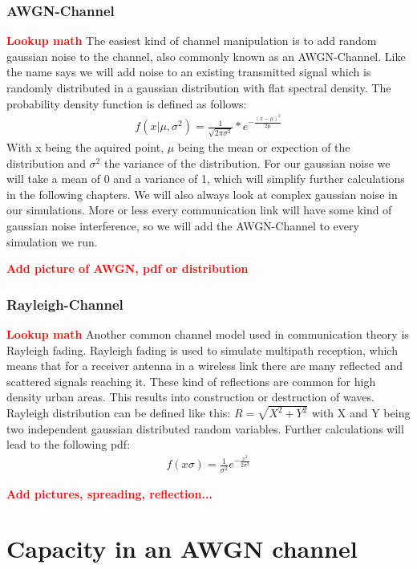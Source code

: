 \documentclass[12pt,oneside, reqno]{report}
\newcommand\boldred[1]{\textcolor{red}{\textbf{#1}}}
\begin{document}
\subsection{AWGN-Channel}
\boldred{Lookup math}
\newline
The easiest kind of channel manipulation is to add random gaussian noise to the channel, also commonly known as an \gls{AWGN}-Channel. Like the name says we will add noise to an existing transmitted signal which is randomly distributed in a gaussian distribution with flat spectral density. The probability density function is defined as follows:
\begin{gather*}
f(x|\mu,\sigma^2) = \frac{1}{\sqrt{2\pi\sigma^2}}*e^{-\frac{(x-\mu)^2}{2\mu}}
\end{gather*}
With x being the aquired point, $\mu$ being the mean or expection of the distribution and $\sigma^2$ the variance of the distribution. For our gaussian noise we will take a mean of 0 and a variance of 1, which will simplify further calculations in the following chapters. We will also always look at complex gaussian noise in our simulations. More or less every communication link will have some kind of gaussian noise interference, so we will add the AWGN-Channel to every simulation we run.

\boldred{Add picture of AWGN, pdf or distribution}

\subsection{Rayleigh-Channel}
\boldred{Lookup math}
Another common channel model used in communication theory is Rayleigh fading. Rayleigh fading is used to simulate multipath reception, which means that for a receiver antenna in a wireless link there are many reflected and scattered signals reaching it. These kind of reflections are common for high density urban areas. This results into construction or destruction of waves. Rayleigh distribution can be defined like this: $R = \sqrt{X^2 + Y^2}$ with X and Y being two independent gaussian distributed random variables. Further calculations will lead to the following pdf:
\begin{gather*}
f(x\sigma) = \frac{1}{\sigma^2}e^{-\frac{x^2}{2\sigma^2}} 
\end{gather*} 

\boldred{Add pictures, spreading, reflection...}
	
\newpage
\chapter{Capacity in an AWGN channel}
\end{document}
